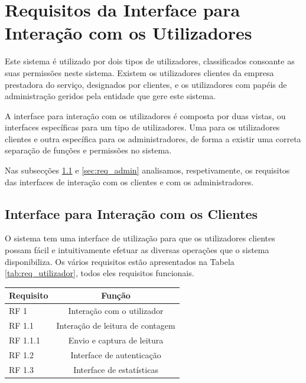 \section{Requisitos da Interface para Interação com os Utilizadores} \label{sec:req_ut}
Este sistema é utilizado por dois tipos de utilizadores, classificados consoante as suas permissões neste sistema. Existem os utilizadores clientes da empresa prestadora do serviço, designados por clientes, e os utilizadores com papéis de administração geridos pela entidade que gere este sistema. \par
A interface para interação com os utilizadores é composta por duas vistas, ou interfaces específicas para um tipo de utilizadores. Uma para os utilizadores clientes e outra específica para os administradores, de forma a existir uma correta separação de funções e permissões no sistema. \par
Nas subsecções \ref{sec:req_ut2} e \ref{sec:req_admin} analisamos, respetivamente, os requisitos das interfaces de interação com os clientes e com os administradores.

\subsection{Interface para Interação com os Clientes} \label{sec:req_ut2}
O sistema tem uma interface de utilização para que os utilizadores clientes possam fácil e intuitivamente efetuar as diversas operações que o sistema disponibiliza. Os vários requisitos estão apresentados na Tabela \ref{tab:req_utilizador}, todos eles requisitos funcionais.

\begin{center}
\begin{tabular}[c]{l  c }  %
\hline
Requisito & Função\\
\hline
RF 1 & Interação com o utilizador\\ 

RF 1.1 & Interação de leitura de contagem\\

RF 1.1.1 & Envio e captura de leitura\\

RF 1.2 & Interface de autenticação\\

RF 1.3 & Interface de estatísticas\\
\hline
\end{tabular}
\label{tab:req_utilizador}
\end{center}
\vspace{8mm} %

